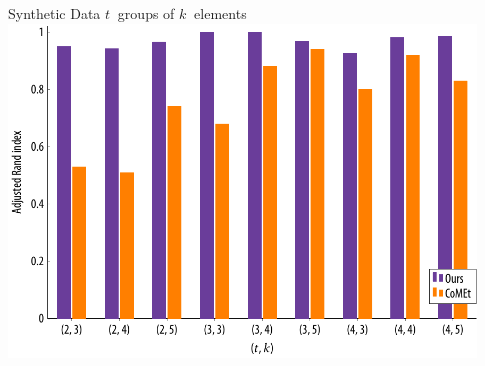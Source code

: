 \documentclass[mathserif]{beamer}
\begin{document}
\begin{frame}{Synthetic Data}
$t\ $ groups of $k\ $ elements\\
\vspace{1em}
\centering
\includegraphics[width=0.93\textwidth]{figures/syn_multi.pdf}%
\end{frame}
\end{document}
